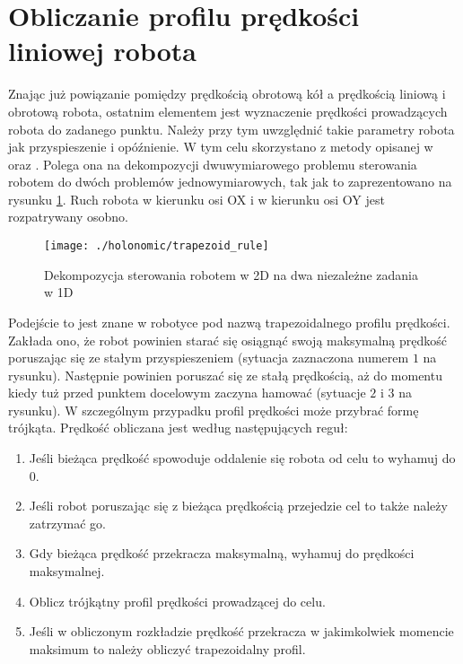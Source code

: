 \section{Obliczanie profilu prędkości liniowej robota \label{sec:trapezoid_vel}}
Znając już powiązanie pomiędzy prędkością obrotową kół a prędkością liniową i obrotową robota, ostatnim elementem jest wyznaczenie prędkości prowadzących 
robota do zadanego punktu. Należy przy tym uwzględnić takie parametry robota jak przyspieszenie i opóźnienie. W tym celu skorzystano z metody opisanej w 
\cite{trapezy1} oraz \cite{trapezy2}. Polega ona na dekompozycji dwuwymiarowego problemu sterowania robotem do dwóch problemów jednowymiarowych, tak jak to zaprezentowano
na rysunku \ref{fig:trapezoid_rule}. Ruch robota w kierunku osi OX i w kierunku osi OY jest rozpatrywany osobno. 
\begin{figure}[H]
\centering
\texttt{[image: ./holonomic/trapezoid\_rule]}
\caption{ Dekompozycja sterowania robotem w 2D na dwa niezależne zadania w 1D }\label{fig:trapezoid_rule}
\end{figure}
Podejście to jest znane w robotyce pod nazwą trapezoidalnego profilu prędkości.
Zakłada ono, że robot powinien starać się osiągnąć swoją maksymalną prędkość poruszając się ze stałym przyspieszeniem (sytuacja zaznaczona numerem $1$ na rysunku).
Następnie powinien poruszać się ze stałą prędkością, aż do momentu kiedy tuż przed punktem docelowym zaczyna hamować (sytuacje $2$ i $3$ na rysunku). 
W szczególnym przypadku profil prędkości może przybrać formę trójkąta.
Prędkość obliczana jest według następujących reguł:
\begin{enumerate}
\item Jeśli bieżąca prędkość spowoduje oddalenie się robota od celu to wyhamuj do 0.
\item Jeśli robot poruszając się z bieżąca prędkością przejedzie cel to także należy zatrzymać go.
\item Gdy bieżąca prędkość przekracza maksymalną, wyhamuj do prędkości maksymalnej.
\item Oblicz trójkątny profil prędkości prowadzącej do celu.
\item Jeśli w obliczonym rozkładzie prędkość przekracza w jakimkolwiek momencie maksimum to należy obliczyć trapezoidalny profil. 
\end{enumerate} 

